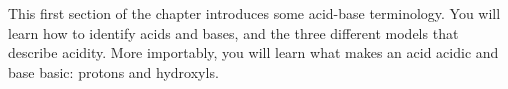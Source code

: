 \documentclass[main.tex]{subfiles}
\begin{document}
\section{\color{blue!30!black}{The nature of acids \& Bases}}
This first section of the chapter introduces some acid-base terminology. You will learn how to identify acids and bases, and the three different models that describe acidity. More importably, you will learn what makes an acid acidic and base basic: protons and hydroxyls. 
\sloppy
\end{document}
